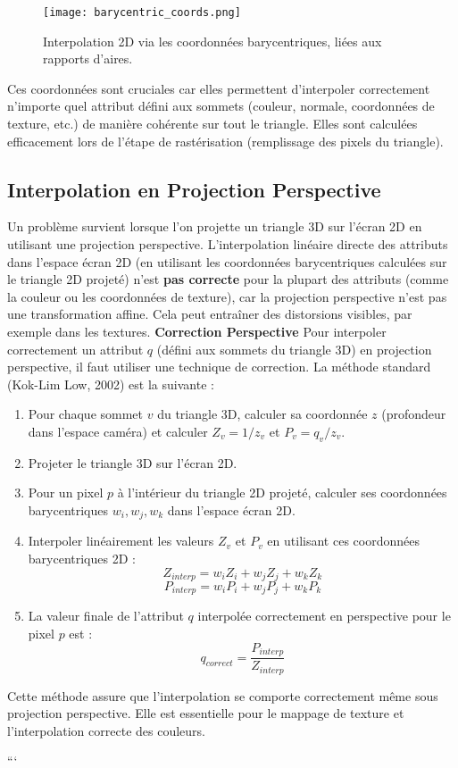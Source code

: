 \begin{figure}[H]
\centering
\texttt{[image: barycentric\_coords.png]}
\caption{Interpolation 2D via les coordonnées barycentriques, liées aux rapports d'aires.}
\label{fig:barycentric_coords}
\end{figure}
Ces coordonnées sont cruciales car elles permettent d'interpoler correctement n'importe quel attribut défini aux sommets (couleur, normale, coordonnées de texture, etc.) de manière cohérente sur tout le triangle. Elles sont calculées efficacement lors de l'étape de rastérisation (remplissage des pixels du triangle).
\subsection{Interpolation en Projection Perspective}
Un problème survient lorsque l'on projette un triangle 3D sur l'écran 2D en utilisant une projection perspective. L'interpolation linéaire directe des attributs dans l'espace écran 2D (en utilisant les coordonnées barycentriques calculées sur le triangle 2D projeté) n'est \textbf{pas correcte} pour la plupart des attributs (comme la couleur ou les coordonnées de texture), car la projection perspective n'est pas une transformation affine. Cela peut entraîner des distorsions visibles, par exemple dans les textures.
\textbf{Correction Perspective}
Pour interpoler correctement un attribut \(q\) (défini aux sommets du triangle 3D) en projection perspective, il faut utiliser une technique de correction. La méthode standard (Kok-Lim Low, 2002) est la suivante :
\begin{enumerate}
    \item Pour chaque sommet \(v\) du triangle 3D, calculer sa coordonnée \(z\) (profondeur dans l'espace caméra) et calculer \(Z_v = 1/z_v\) et \(P_v = q_v / z_v\).
    \item Projeter le triangle 3D sur l'écran 2D.
    \item Pour un pixel \(p\) à l'intérieur du triangle 2D projeté, calculer ses coordonnées barycentriques \(w_i, w_j, w_k\) dans l'espace écran 2D.
    \item Interpoler linéairement les valeurs \(Z_v\) et \(P_v\) en utilisant ces coordonnées barycentriques 2D :
       \[ Z_{interp} = w_i Z_i + w_j Z_j + w_k Z_k \]
       \[ P_{interp} = w_i P_i + w_j P_j + w_k P_k \]
    \item La valeur finale de l'attribut \(q\) interpolée correctement en perspective pour le pixel \(p\) est :
       \[ q_{correct} = \frac{P_{interp}}{Z_{interp}} \]
\end{enumerate}
Cette méthode assure que l'interpolation se comporte correctement même sous projection perspective. Elle est essentielle pour le mappage de texture et l'interpolation correcte des couleurs.

```